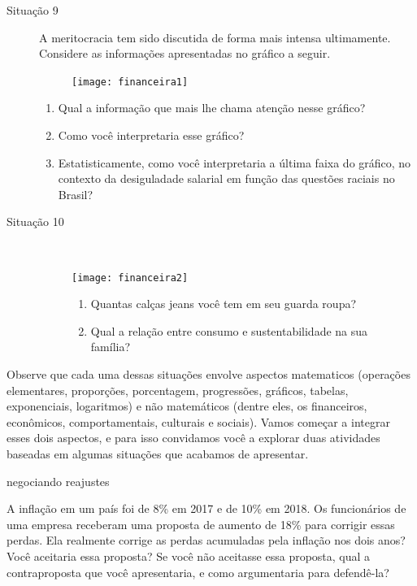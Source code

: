 \begin{description}
\item[{Situação 9}]

A meritocracia tem sido discutida de forma mais intensa ultimamente. Considere as informações apresentadas no gráfico a seguir.

\begin{figure}[H]
\centering

\texttt{[image: financeira1]}
\end{figure}

\begin{enumerate}
  \item Qual a informação que mais lhe chama atenção nesse gráfico?
  \item Como você interpretaria esse gráfico?
  \item Estatisticamente, como você interpretaria a última faixa do gráfico, no contexto da desiguladade salarial em função das questões raciais no Brasil?
\end{enumerate}
\end{description}
\needspace{2em}
\begin{description}
\item[Situação 10]\

\begin{figure}[H]
\centering

\texttt{[image: financeira2]}
\begin{enumerate}
  \item Quantas calças jeans você tem em seu guarda roupa?
  \item Qual a relação entre consumo e sustentabilidade na sua família?
\end{enumerate}
\end{figure}

\end{description}

Observe que cada uma dessas situações envolve aspectos matematicos (operações elementares, proporções, porcentagem, progressões, gráficos, tabelas, exponenciais, logaritmos) e não matemáticos (dentre eles, os financeiros, econômicos, comportamentais, culturais e sociais). Vamos começar a integrar esses dois aspectos, e para isso convidamos você a explorar duas atividades baseadas em algumas situações que acabamos de apresentar.


\begin{task}{negociando reajustes}
\label{fin-ativ-1}

A inflação em um país foi de 8\% em 2017 e de 10\% em 2018. Os funcionários de uma empresa receberam uma proposta de aumento de 18\% para corrigir essas perdas. Ela realmente corrige as perdas acumuladas pela inflação nos dois anos? Você aceitaria essa proposta? Se você não aceitasse essa proposta, qual a contraproposta que você apresentaria, e como argumentaria para defendê-la?
\end{task}

